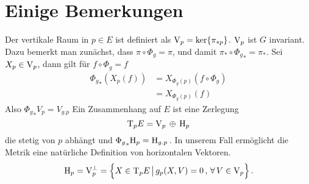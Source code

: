 \section{Einige Bemerkungen}
Der vertikale Raum in $p\in E$ ist definiert als $\mathrm{V}_p=\ker\{\pi_{*p}\}$.
$\mathrm{V}_p$ ist $G$ invariant. Dazu bemerkt man zunächst, dass $\pi\circ\Phi_g=\pi$, und
damit $\pi_*\circ{\Phi_g}_*=\pi_*$. Sei $X_p\in \mathrm{V}_p$, dann gilt für 
$f\circ \Phi_g = f$ 
\begin{equation}
\begin{split}
{\Phi_g}_*\left(X_p(f)\right)&=X_{\Phi_g(p)}(f\circ\Phi_g)\\
&=X_{\Phi_g(p)}(f)
\end{split}
\end{equation}
Also ${\Phi_g}_*V_p=V_{g.p}$
Ein Zusammenhang auf $E$ ist eine Zerlegung 
\begin{equation}
\mathrm{T}_p E=\mathrm{V}_p\,\oplus\, \mathrm{H}_p
\end{equation}
die stetig von $p$ abhängt und ${\Phi_g}_*\mathrm{H}_p=\mathrm{H}_{g.p}$\,.
In unserem Fall ermöglicht die Metrik eine natürliche Definition von
horizontalen Vektoren.
\begin{equation}
\Horp=\Verp^\perp=\left\{X\in \Tanp E\,\big|\, g_p(X,V)=0\,,\,\forall\, V\in
\Verp\right\}\,.
\end{equation}
